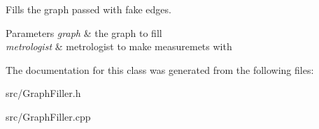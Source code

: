 Fills the graph passed with fake edges. 


\begin{DoxyParams}{Parameters}
{\em graph} & the graph to fill \\
\hline
{\em metrologist} & metrologist to make measuremets with \\
\hline
\end{DoxyParams}


The documentation for this class was generated from the following files\+:\begin{DoxyCompactItemize}
\item 
src/Graph\+Filler.\+h\item 
src/Graph\+Filler.\+cpp\end{DoxyCompactItemize}
